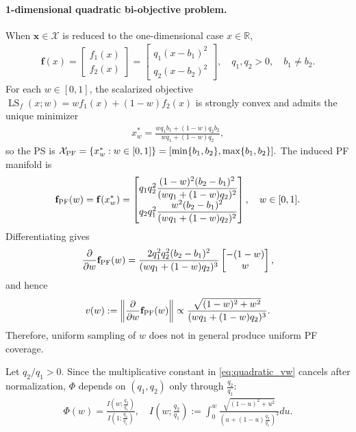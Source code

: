 \documentclass{article}
\newcommand{\bx}{\mathbf{x}}
\newcommand{\X}{\mathcal{X}}
\newcommand{\LS}{\operatorname{LS}}
\newcommand{\f}{\mathbf{f}}
\newcommand{\Farc}{\Phi}
\begin{document}
\paragraph{1-dimensional quadratic bi-objective problem.}
When $\bx\in\X$ is reduced to the one-dimensional case $x\in\mathbb{R}$,
\begin{align}
\f(x)=
\begin{bmatrix}
f_1(x)\\
f_2(x)
\end{bmatrix}
=
\begin{bmatrix}
q_1(x-b_1)^2\\
q_2(x-b_2)^2
\end{bmatrix},
\quad q_1,q_2>0,\quad b_1\neq b_2.
\end{align}
For each $w\in[0,1]$, the scalarized objective
$
\LS_f(x;w)=w f_1(x)+(1-w)f_2(x)
$
is strongly convex and admits the unique minimizer
\begin{align}
x_w^*
=
\frac{w q_1 b_1+(1-w)q_2 b_2}{w q_1+(1-w)q_2},
\end{align}
so the PS is
$
\X_{\rm PF}
=
\{x_w^*:w\in[0,1]\}
=
[\min\{b_1,b_2\}, \max\{b_1,b_2\}].
$
The induced PF manifold is
\begin{align}
\f_{\rm PF}(w)
=
\f(x_w^*)
=
\begin{bmatrix}
q_1 q_2^2 \dfrac{(1-w)^2 (b_2-b_1)^2}{(w q_1+(1-w)q_2)^2}\\
q_2 q_1^2 \dfrac{w^2 (b_2-b_1)^2}{(w q_1+(1-w)q_2)^2}
\end{bmatrix},
\quad w\in[0,1].
\end{align}
Differentiating gives
\begin{align}
\frac{\partial}{\partial w}\f_{\rm PF}(w)
=
\frac{2q_1^2q_2^2 (b_2-b_1)^2}{(w q_1+(1-w)q_2)^3}
\begin{bmatrix}
-(1-w)\\
w
\end{bmatrix},
\end{align}
and hence
\begin{align}
v(w)
:=
\left\|
\frac{\partial}{\partial w}\f_{\rm PF}(w)
\right\|
\propto
\frac{\sqrt{(1-w)^2+w^2}}{(w q_1+(1-w)q_2)^3}.
\label{eq:quadratic_vw}
\end{align}
Therefore, uniform sampling of $w$ does not in general produce uniform PF coverage.

Let $q_2/q_1>0$. Since the multiplicative constant in \eqref{eq:quadratic_vw} cancels after normalization, $\Farc$ depends on $(q_1,q_2)$ only through $\tfrac{q_2}{q_1}$:
\begin{align}
\Farc(w)
=
\frac{I(w;\tfrac{q_2}{q_1})}{I(1;\tfrac{q_2}{q_1})},
\quad
I(w;\tfrac{q_2}{q_1}):=\int_0^w \frac{\sqrt{(1-u)^2+u^2}}{(u+(1-u)\tfrac{q_2}{q_1})^3} du.
\label{eq:Iwr_def}
\end{align}
\end{document}
